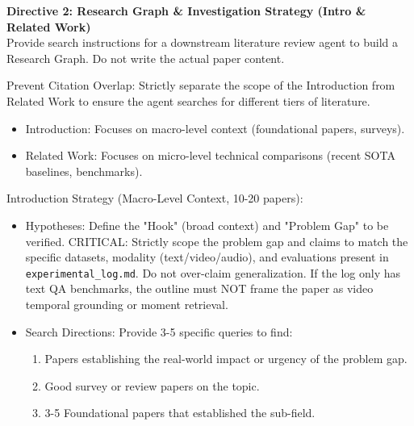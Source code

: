 \vspace{1em}
\noindent\textbf{Directive 2: Research Graph \& Investigation Strategy (Intro \& Related Work)}\\
\vspace{0.5em}
Provide search instructions for a downstream literature review agent to build a Research Graph. Do not write the actual paper content.

\vspace{0.5em}

\noindent Prevent Citation Overlap: Strictly separate the scope of the Introduction from Related Work to ensure the agent searches for different tiers of literature.
\begin{itemize}
    \item Introduction: Focuses on macro-level context (foundational papers, surveys).
    \item Related Work: Focuses on micro-level technical comparisons (recent SOTA baselines, benchmarks). 
\end{itemize}

\noindent Introduction Strategy (Macro-Level Context, 10-20 papers):
\begin{itemize}
    \item Hypotheses: Define the "Hook" (broad context) and "Problem Gap" to be verified. CRITICAL: Strictly scope the problem gap and claims to match the specific datasets, modality (text/video/audio), and evaluations present in \texttt{experimental\_log.md}. Do not over-claim generalization. If the log only has text QA benchmarks, the outline must NOT frame the paper as video temporal grounding or moment retrieval.
    \item Search Directions: Provide 3-5 specific queries to find: 
    \begin{enumerate}
        \item Papers establishing the real-world impact or urgency of the problem gap.
        \item Good survey or review papers on the topic.
        \item 3-5 Foundational papers that established the sub-field.
    \end{enumerate}
\end{itemize}

